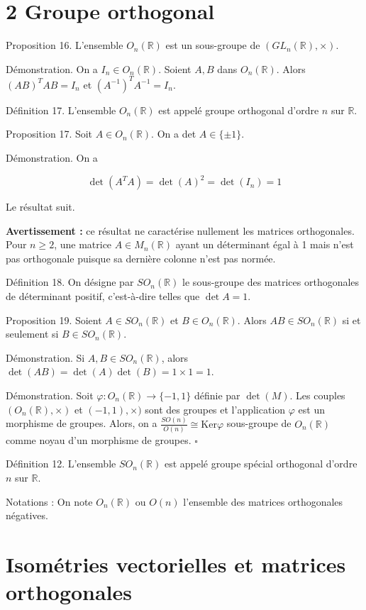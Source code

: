 \section{2 Groupe orthogonal}

Proposition 16. L'ensemble $O_n(\mathbb{R})$ est un sous-groupe de $(GL_n(\mathbb{R}), \times)$.

Démonstration. On a $I_n \in O_n(\mathbb{R})$. Soient $A, B$ dans $O_n(\mathbb{R})$. Alors $(AB)^T AB = I_n$ et $(A^{-1})^T A^{-1} = I_n$.

Définition 17. L'ensemble $O_n(\mathbb{R})$ est appelé groupe orthogonal d'ordre $n$ sur $\mathbb{R}$.

Proposition 17. Soit $A \in O_n(\mathbb{R})$. On a det $A \in \{ \pm 1 \}$.

Démonstration. On a

\[ \det(A^T A) = \det(A)^2 = \det(I_n) = 1 \]

Le résultat suit.

\textbf{Avertissement :} ce résultat ne caractérise nullement les matrices orthogonales. Pour $n \geq 2$, une matrice $A \in M_n(\mathbb{R})$ ayant un déterminant égal à 1 mais n'est pas orthogonale puisque sa dernière colonne n'est pas normée.

Définition 18. On désigne par $SO_n(\mathbb{R})$ le sous-groupe des matrices orthogonales de déterminant positif, c'est-à-dire telles que $\det A = 1$.

Proposition 19. Soient $A \in SO_n(\mathbb{R})$ et $B \in O_n(\mathbb{R})$. Alors $AB \in SO_n(\mathbb{R})$ si et seulement si $B \in SO_n(\mathbb{R})$.

Démonstration.  Si $A, B \in SO_n(\mathbb{R})$, alors $\det(AB) = \det(A) \det(B) = 1 \times 1 = 1$.

Démonstration. Soit $\varphi : O_n(\mathbb{R}) \to \{-1, 1\}$ définie par $\det(M)$. Les couples $(O_n(\mathbb{R}), \times)$ et $(-1, 1), \times)$ sont des groupes et l'application $\varphi$ est un morphisme de groupes. Alors, on a $\frac{SO(n)}{O(n)} \cong \text{Ker} \varphi$ sous-groupe de $O_n(\mathbb{R})$ comme noyau d'un morphisme de groupes. \hfill $\square$

Définition 12. L'ensemble $SO_n(\mathbb{R})$ est appelé groupe spécial orthogonal d'ordre $n$ sur $\mathbb{R}$.

Notations : On note $O_n(\mathbb{R})$ ou $O(n)$ l'ensemble des matrices orthogonales négatives.

\section{Isométries vectorielles et matrices orthogonales}

